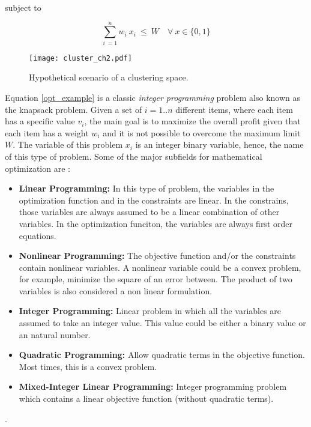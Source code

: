 subject to 

\begin{equation}
    \sum_{i\ = 1}^{n} w_i\ x_i \ \leq \ W \quad \forall \ x \in \{0,1\}
\end{equation}

\begin{figure}[htb]
    \centering
    \texttt{[image: cluster\_ch2.pdf]}
    \caption{Hypothetical scenario of a clustering space.}
    \label{cluster_ch2}
\end{figure}

Equation \eqref{opt_example} is a classic \textit{integer programming} problem also known as the knapsack problem. Given a set of $i = 1..n$ different items, where each item has a specific value $v_i$, the main goal is to maximize the overall profit given that each item has a weight $w_i$ and it is not possible to overcome the maximum limit $W$. The variable of this problem $x_i$ is an integer binary variable, hence, the name of this type of problem. Some of the major subfields for mathematical optimization are \cite{cplex, ampl}:
\begin{itemize}
    \item \textbf{Linear Programming:} In this type of problem, the variables in the optimization function and in the constraints are linear. In the constrains, those variables are always assumed to be a linear combination of other variables. In the optimization funciton, the variables are always first order equations.  
    \item \textbf{Nonlinear Programming:} The objective function and/or the constraints contain nonlinear variables. A nonlinear variable could be a convex problem, for example, minimize the square of an error between. The product of two variables is also considered a non linear formulation. 
    \item \textbf{Integer Programming:} Linear problem in which all the variables are assumed to take an integer value. This value could be either a binary value or an natural number. 
    \item \textbf{Quadratic Programming:} Allow quadratic terms in the objective function. Most times, this is a convex problem.
    \item \textbf{Mixed-Integer Linear Programming:} Integer programming problem which contains a linear objective function (without quadratic terms).
\end{itemize}

\cite{cplex}. 


